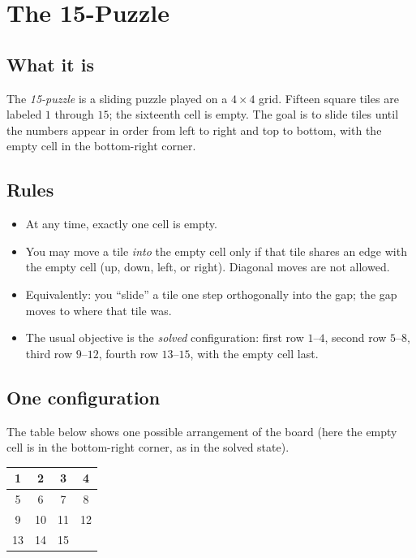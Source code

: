 \chapter{The 15-Puzzle}
\section{What it is}
The \emph{15-puzzle} is a sliding puzzle played on a \(4\times 4\) grid. Fifteen
square tiles are labeled \(1\) through \(15\); the sixteenth cell is empty. The
goal is to slide tiles until the numbers appear in order from left to right and
top to bottom, with the empty cell in the bottom-right corner.

\section{Rules}
\begin{itemize}
  \item At any time, exactly one cell is empty.
  \item You may move a tile \emph{into} the empty cell only if that tile shares
  an edge with the empty cell (up, down, left, or right). Diagonal moves are not
  allowed.
  \item Equivalently: you ``slide'' a tile one step orthogonally into the gap;
  the gap moves to where that tile was.
  \item The usual objective is the \emph{solved} configuration: first row
  \(1\)--\(4\), second row \(5\)--\(8\), third row \(9\)--\(12\), fourth row
  \(13\)--\(15\), with the empty cell last.
\end{itemize}

\section{One configuration}
The table below shows one possible arrangement of the board (here the empty
cell is in the bottom-right corner, as in the solved state).

\begin{center}
\begin{tabular}{|c|c|c|c|}
\hline
1 & 2 & 3 & 4 \\
\hline
5 & 6 & 7 & 8 \\
\hline
9 & 10 & 11 & 12 \\
\hline
13 & 14 & 15 & \\
\hline
\end{tabular}
\end{center}


